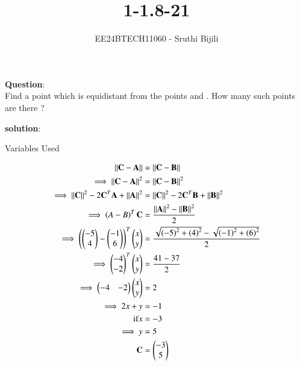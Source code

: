 \documentclass[journal]{IEEEtran}
\begin{document}

\vspace{3cm}

\title{1-1.8-21}
\author{EE24BTECH11060 - Sruthi Bijili}
{\let\newpage\relax\maketitle}

\renewcommand{\thefigure}{\theenumi}
\renewcommand{\thetable}{\theenumi}
\setlength{\intextsep}{10pt} %


\renewcommand{\thetable}{\theenumi}

\textbf{Question}:\\
Find a point which is equidistant from the points  and . How many such points are there ?

\textbf{solution}:\\
\begin{table}[h!]    
  \centering
  
  \caption{Variables Used}
  \label{tab1.1.8.21}
\end{table}
\begin{align}
\left\vert\left\vert\mathbf{C}-\mathbf{A}\right\vert\right\vert&=\left\vert\left\vert\mathbf{C}-\mathbf{B}\right\vert\right\vert\\
\implies\left\vert\left\vert\mathbf{C}-\mathbf{A}\right\vert\right\vert^2&=\left\vert\left\vert\mathbf{C}-\mathbf{B}\right\vert\right\vert^2\\
\implies\left\vert\left\vert\mathbf{C}\right\vert\right\vert^2-2\mathbf{C}^T\mathbf{A}+\left\vert\left\vert\mathbf{A}\right\vert\right\vert^2&=\left\vert\left\vert\mathbf{C}\right\vert\right\vert^2-2\mathbf{C}^T\mathbf{B}+\left\vert\left\vert\mathbf{B}\right\vert\right\vert^2\\
\implies\left(A-B\right)^T\mathbf{C}&=\frac{\left\vert\left\vert\mathbf{A}\right\vert\right\vert^2-\left\vert\left\vert\mathbf{B}\right\vert\right\vert^2}{2}\\
\implies\left({\begin{pmatrix}-5 \\ 4\end{pmatrix}}-{\begin{pmatrix}-1 \\ 6\end{pmatrix}}\right)^T\begin{pmatrix}x \\ y\end{pmatrix}&=\frac{\sqrt{\left(-5\right)^2+\left(4\right)^2}-\sqrt{\left(-1\right)^2+\left(6\right)^2}}{2}\\
\implies\begin{pmatrix}-4 \\-2\end{pmatrix}^T\begin{pmatrix}x \\ y\end{pmatrix}&=\frac{41-37}{2}\\
\implies\begin{pmatrix}-4 &-2\end{pmatrix}\begin{pmatrix}x \\ y\end{pmatrix}&=2\\
\implies 2x+y&=-1\\
\text{if} x&=-3\\
\implies y&=5\\
\mathbf{C}&=\begin{pmatrix}-3 \\ 5\end{pmatrix}
\end{align}
\end{document}
